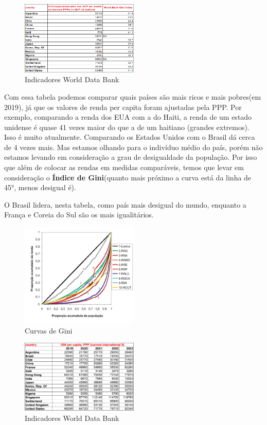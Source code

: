 \documentclass[a4paper,12pt]{article}[abntex2]
\begin{document}
\begin{figure}[H]
        \centering
        \caption{Indicadores World Data Bank} 
        \includegraphics[width=0.5\textwidth]{Imagens/a1i3.png}
\end{figure}

Com essa tabela podemos comparar quais países são mais ricos e mais pobres(em 2019), já que os valores de renda per capita foram ajustadas pela PPP. Por exemplo, comparando a renda dos EUA com a do Haiti, a renda de um estado unidense é quase 41 vezes maior do que a de um haitiano (grandes extremos). Isso é muito atualmente. Comparando os Estados Unidos com o Brasil dá cerca de 4 vezes mais. Mas estamos olhando para o indivíduo médio do país, porém não estamos levando em consideração a grau de desigualdade da população. Por isso que além de colocar as rendas em medidas comparáveis, temos que levar em consideração o \textbf{Índice de Gini}(quanto mais próximo a curva está da linha de 45°, menos desigual é).

O Brasil lidera, nesta tabela, como país mais desigual do mundo, enquanto a França e Coreia do Sul são os mais igualitários.

\begin{figure}[H]
        \centering
        \caption{Curvas de Gini} 
        \includegraphics[width=0.5\textwidth]{Imagens/a1i20.png}
\end{figure}

\begin{figure}[H]
        \centering
        \caption{Indicadores World Data Bank} 
        \includegraphics[width=0.5\textwidth]{Imagens/a1i4.png}
\end{figure}
\end{document}
